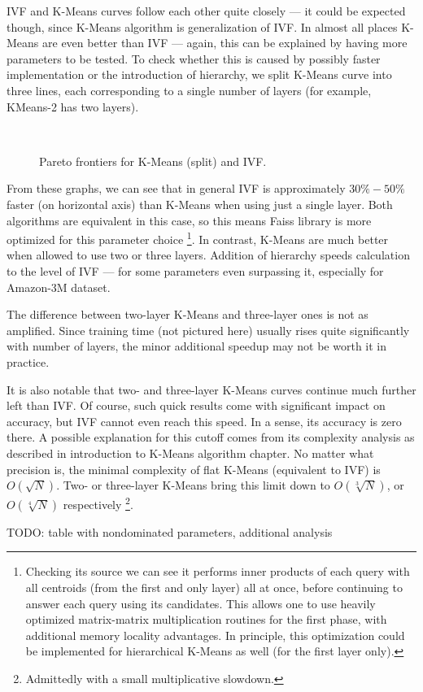 IVF and K-Means curves follow each other quite closely --- it could be expected though,
since K-Means algorithm is generalization of IVF. In almost all places K-Means are even
better than IVF --- again, this can be explained by having more parameters to be tested.
To check whether this is caused by possibly faster implementation or the introduction of
hierarchy, we split K-Means curve into three lines, each corresponding to a single
number of layers (for example, KMeans-2 has two layers).

\begin{figure}[H]
	\centering
	\\
	\caption{Pareto frontiers for K-Means (split) and IVF.}
\end{figure}

From these graphs, we can see that in general IVF is approximately $30\% - 50\%$ faster
(on horizontal axis) than K-Means when using just a single layer. Both algorithms are 
equivalent in this case, so this means Faiss library is more optimized for this parameter 
choice \footnote{
Checking its source we can see it performs inner products of each query with all centroids
(from the first and only layer) all at once, before continuing to answer each query 
using its candidates. This allows one to use heavily optimized matrix-matrix multiplication
routines for the first phase, with additional memory locality advantages. 
In principle, this optimization
could be implemented for hierarchical K-Means as well (for the first layer only).
}.
In contrast, K-Means are much better when allowed to use two or three layers. Addition
of hierarchy speeds calculation to the level of IVF --- for some parameters even surpassing
it, especially for Amazon-3M dataset.

The difference between two-layer K-Means and three-layer ones is not as amplified. Since
training time (not pictured here) usually rises quite significantly with number of layers,
the minor additional speedup may not be worth it in practice.

It is also notable that two- and three-layer K-Means curves continue much further left
than IVF. Of course, such quick results come with significant impact on accuracy, but
IVF cannot even reach this speed. In a sense, its accuracy is zero there.
A possible explanation for this cutoff comes from its complexity analysis as described
in introduction to K-Means algorithm chapter. No matter what precision is, the minimal
complexity of flat K-Means (equivalent to IVF) is $O(\sqrt{N})$. Two- or three-layer
K-Means bring this limit down to $O(\sqrt[3]{N})$, or $O(\sqrt[4]{N})$ respectively
\footnote{Admittedly with a small multiplicative slowdown.}.

TODO: table with nondominated parameters, additional analysis



